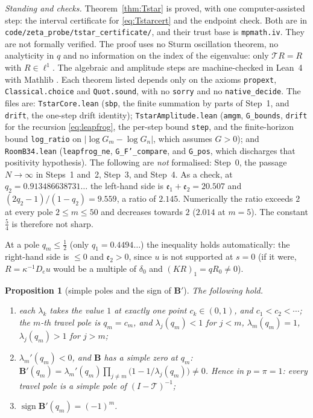 \documentclass[11pt]{article}
\theoremstyle{plain}
\newtheorem{proposition}[theorem]{Proposition}
\theoremstyle{definition}
\theoremstyle{remark}
\begin{document}
\noindent\emph{Standing and checks.} Theorem~\ref{thm:Tstar} is proved, with one computer-assisted
step: the interval certificate for \eqref{eq:Tstarcert} and the endpoint check. Both are in
\texttt{code/zeta\_probe/tstar\_certificate/}, and their trust base is \texttt{mpmath.iv}. They are
not formally verified. The proof uses no Sturm oscillation theorem, no analyticity in $q$ and no
information on the index of the eigenvalue: only $\mathcal TR=R$ with $R\in\ell^1$. The algebraic and
amplitude steps are machine-checked in Lean~4 with Mathlib \cite{MathlibCommunity}. Each theorem
listed depends only on the axioms \texttt{propext}, \texttt{Classical.choice} and
\texttt{Quot.sound}, with no \texttt{sorry} and no \texttt{native\_decide}. The files are:
\texttt{TstarCore.lean} (\texttt{sbp}, the finite summation by parts of Step~1, and \texttt{drift},
the one-step drift identity); \texttt{TstarAmplitude.lean} (\texttt{amgm}, \texttt{G\_bounds},
\texttt{drift} for the recursion \eqref{eq:leapfrog}, the per-step bound \texttt{step}, and the
finite-horizon bound \texttt{log\_ratio} on $|\log G_m-\log G_n|$, which assumes $G>0$); and
\texttt{RoomB34.lean} (\texttt{leapfrog\_ne}, \texttt{G\_F'\_compare}, and \texttt{G\_pos}, which
discharges that positivity hypothesis). The following are \emph{not} formalised: Step~0, the
passage $N\to\infty$ in Steps~1 and~2, Step~3, and Step~4. As a check, at $q_2=0.913486638731\ldots$
the left-hand side is $\mathfrak e_1+\mathfrak e_2=20.507$ and $(2q_2-1)/(1-q_2)=9.559$, a ratio
of $2.145$. Numerically the ratio exceeds $2$ at every pole $2\le m\le50$ and decreases towards $2$
($2.014$ at $m=5$). The constant $\frac54$ is therefore not sharp.

\noindent At a pole $q_m\le\tfrac12$ (only $q_1=0.4494\ldots$) the inequality holds automatically:
the right-hand side is $\le0$ and $\mathfrak e_2>0$, since $u$ is not supported at $s=0$ (if it were,
$R=\kappa^{-1}D_eu$ would be a multiple of $\delta_0$ and $(KR)_1=qR_0\ne0$).

\begin{proposition}[simple poles and the sign of $\mathbf B'$]\label{prop:simplepoles}
The following hold.
\begin{enumerate}[label=\textup{(\roman*)},leftmargin=2.2em,itemsep=0.1em,topsep=0.2em]
\item each $\lambda_k$ takes the value $1$ at exactly one point $c_k\in(0,1)$, and
$c_1<c_2<\cdots$; the $m$-th travel pole is $q_m=c_m$, and $\lambda_j(q_m)<1$ for $j<m$,
$\lambda_m(q_m)=1$, $\lambda_j(q_m)>1$ for $j>m$;
\item $\lambda_m'(q_m)<0$, and $\mathbf B$ has a simple zero at $q_m$:
$\mathbf B'(q_m)=\lambda_m'(q_m)\prod_{j\ne m}\bigl(1-1/\lambda_j(q_m)\bigr)\ne0$. Hence in
{\cite[Proposition ``the shape of the local form'', \textup{prop:shape}]{Bonfioli2026bA}} $p=\pi=1$: every travel pole is a simple pole of $(I-\mathcal T)^{-1}$;
\item $\operatorname{sign}\mathbf B'(q_m)=(-1)^m$.
\end{enumerate}
\end{proposition}
\end{document}
